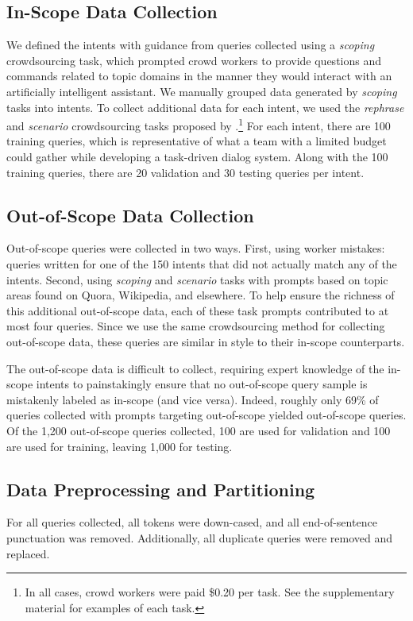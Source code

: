 \documentclass[11pt,a4paper]{article}
\newcommand{\tightparagraph}[1]{\noindent\textbf{#1:}}
\begin{document}
\subsection{In-Scope Data Collection}
We defined the intents with guidance from queries collected using a \emph{scoping} crowdsourcing task, which prompted crowd workers to provide questions and commands related to topic domains in the manner they would interact with an artificially intelligent assistant. We manually grouped data generated by \emph{scoping} tasks into intents. To collect additional data for each intent, we used the \emph{rephrase} and \emph{scenario} crowdsourcing tasks proposed by \citet{naacl18data}.\footnote{
  In all cases, crowd workers were paid \$0.20 per task.
  See the supplementary material for examples of each task.
}
For each intent, there are 100 training queries, which is representative of what a team with a limited budget could gather while developing a task-driven dialog system. Along with the 100 training queries, there are 20 validation and 30 testing queries per intent.

\subsection{Out-of-Scope Data Collection}
Out-of-scope queries were collected in two ways.
First, using worker mistakes: queries written for one of the 150 intents that did not actually match any of the intents.
Second, using \emph{scoping} and \emph{scenario} tasks with prompts based on topic areas found on Quora, Wikipedia, and elsewhere.
To help ensure the richness of this additional out-of-scope data, each of these task prompts contributed to at most four queries.
Since we use the same crowdsourcing method for collecting out-of-scope data, these queries are similar in style to their in-scope counterparts.

The out-of-scope data is difficult to collect, requiring expert knowledge of the in-scope intents to painstakingly ensure that no out-of-scope query sample is mistakenly labeled as in-scope (and vice versa).
Indeed, roughly only 69\% of queries collected with prompts targeting out-of-scope yielded out-of-scope queries.
Of the 1,200 out-of-scope queries collected, 100 are used for validation and 100 are used for training, leaving 1,000 for testing.

\subsection{Data Preprocessing and Partitioning}
For all queries collected, all tokens were down-cased, and all end-of-sentence punctuation was removed.
Additionally, all duplicate queries were removed and replaced.
\end{document}
